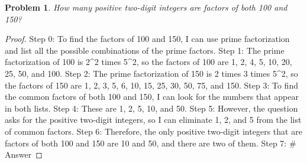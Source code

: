 \documentclass{article}
\newtheorem{theorem}{Problem}
\begin{document}
\begin{theorem}
How many positive two-digit integers are factors of both 100 and 150?
\end{theorem}

\begin{proof}
Step 0: To find the factors of 100 and 150, I can use prime factorization and list all the possible combinations of the prime factors.
Step 1: The prime factorization of 100 is 2^2 times 5^2, so the factors of 100 are 1, 2, 4, 5, 10, 20, 25, 50, and 100.
Step 2: The prime factorization of 150 is 2 times 3 times 5^2, so the factors of 150 are 1, 2, 3, 5, 6, 10, 15, 25, 30, 50, 75, and 150.
Step 3: To find the common factors of both 100 and 150, I can look for the numbers that appear in both lists.
Step 4: These are 1, 2, 5, 10, and 50.
Step 5: However, the question asks for the positive two-digit integers, so I can eliminate 1, 2, and 5 from the list of common factors.
Step 6: Therefore, the only positive two-digit integers that are factors of both 100 and 150 are 10 and 50, and there are two of them.
Step 7: # Answer
\end{proof}
\end{document}
